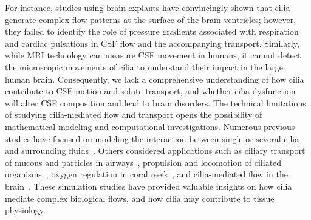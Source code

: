 \documentclass{WileyMSP-template}
\begin{document}



%
%
For instance, studies using brain explants have convincingly shown
that cilia generate complex flow patterns at the surface of the brain
ventricles; however, they failed to identify the role of pressure
gradients associated with respiration and cardiac pulsations in CSF
flow and the accompanying transport. Similarly, while MRI technology
can measure CSF movement in humans, it cannot detect the microscopic
movements of cilia to understand their impact in the large human
brain. Consequently, we lack a comprehensive understanding of how
cilia contribute to CSF motion and solute transport, and whether cilia
dysfunction will alter CSF composition and lead to brain
disorders. The technical limitations of studying cilia-mediated flow and transport opens the
possibility of mathematical modeling and computational investigations. Numerous previous studies
have focused on modeling the interaction between single or several cilia and surrounding
fluids~\cite{Guo2020SimulatingGeometries, Ruvalcaba2021NumericalTree, Smith2009MathematicalFluids,
Cui2019NumericalMethod, Cui2022AFlow}.
Others considered applications such as ciliary transport of mucous and particles in
airways~\cite{Fulford1986Muco-ciliaryLung, Ramirez-SanJuan2020Multi-scaleArrays},
propulsion and locomotion of ciliated organisms~\cite{BLAKE1974MechanicsMotion,
Jahn1972LocomotionProtozoa, Brennen1977FluidFlagella},
oxygen regulation in coral reefs~\cite{Pacherres2022CiliaryProduction},
and cilia-mediated flow in the brain~\cite{Siyahhan2014FlowVentricles,
Yoshida2022EffectVentricles, Salman2022ComputationalEmbryo, Thouvenin2020OriginCanal}.
These simulation studies have provided valuable insights on how cilia mediate complex
biological flows, and how cilia may contribute to tissue physiology.
\end{document}
